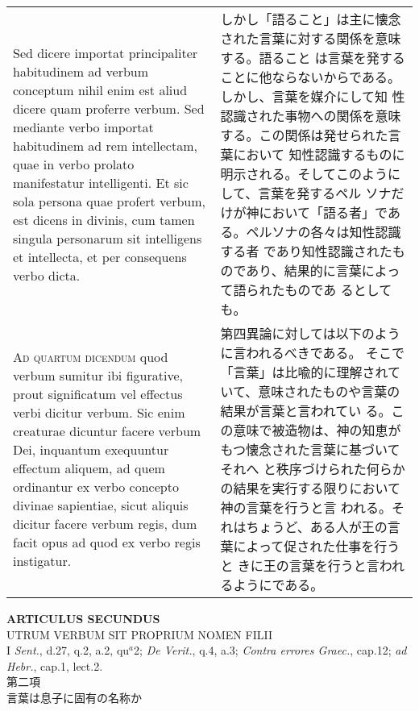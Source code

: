 \documentclass[10pt]{jsarticle} %
\begin{document}
\begin{longtable}{p{21em}p{21em}}
\\



 Sed dicere importat principaliter habitudinem
 ad verbum conceptum nihil enim est aliud dicere quam proferre
 verbum. 
Sed mediante verbo importat habitudinem ad rem intellectam,
 quae in verbo prolato manifestatur intelligenti. Et sic sola persona
 quae profert verbum, est dicens in divinis, cum tamen singula
 personarum sit intelligens et intellecta, et per consequens verbo
 dicta.

&

しかし「語ること」は主に懐念された言葉に対する関係を意味する。語ること
 は言葉を発することに他ならないからである。しかし、言葉を媒介にして知
 性認識された事物への関係を意味する。この関係は発せられた言葉において
 知性認識するものに明示される。そしてこのようにして、言葉を発するペル
 ソナだけが神において「語る者」である。ペルソナの各々は知性認識する者
 であり知性認識されたものであり、結果的に言葉によって語られたものであ
 るとしても。


\\




{\scshape Ad quartum dicendum} quod verbum sumitur ibi figurative, prout
 significatum vel effectus verbi dicitur verbum. Sic enim creaturae
 dicuntur facere verbum Dei, inquantum exequuntur effectum aliquem, ad
 quem ordinantur ex verbo concepto divinae sapientiae, sicut aliquis
 dicitur facere verbum regis, dum facit opus ad quod ex verbo regis
 instigatur.

&

第四異論に対しては以下のように言われるべきである。
そこで「言葉」は比喩的に理解されていて、意味されたものや言葉の結果が言葉と言われてい
 る。この意味で被造物は、神の知恵がもつ懐念された言葉に基づいてそれへ
 と秩序づけられた何らかの結果を実行する限りにおいて神の言葉を行うと言
 われる。それはちょうど、ある人が王の言葉によって促された仕事を行うと
 きに王の言葉を行うと言われるようにである。


\end{longtable}

\newpage


\begin{center}
{\Large {\bf ARTICULUS SECUNDUS}}\\
{\large UTRUM VERBUM SIT PROPRIUM NOMEN FILII}\\
{\footnotesize I {\itshape Sent.}, d.27, q.2, a.2, qu$^{a}$2;
 {\itshape De Verit.}, q.4, a.3; {\itshape Contra errores Graec.},
 cap.12; {\itshape ad Hebr.}, cap.1, lect.2.}\\
{\Large 第二項\\言葉は息子に固有の名称か}
\end{center}
\end{document}
